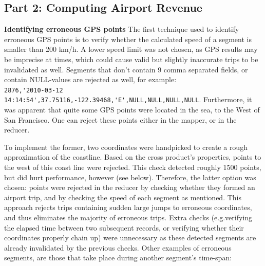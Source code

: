 \documentclass[11pt]{article}
\begin{document}
\subsection*{Part 2: Computing Airport Revenue}

\textbf{Identifying erroneous GPS points}
The first technique used to identify erroneous GPS points is to verify whether the calculated speed of a segment is smaller than 200 km/h. A lower speed limit was not chosen, as GPS results may be imprecise at times, which could cause valid but slightly inaccurate trips to be invalidated as well. Segments that don't contain 9 comma separated fields, or contain NULL-values are rejected as well, for example: \\
\hspace{-2cm}\verb|2876,'2010-03-12 14:14:54',37.75116,-122.39468,'E',NULL,NULL,NULL,NULL|.
Furthermore, it was apparent that quite some GPS points were located in the sea, to the West of San Francisco. One can reject these points either in the mapper, or in the reducer. 



To implement the former, two coordinates were handpicked to create a rough approximation of the coastline. Based on the cross product's properties, points to the west of this coast line were rejected. This check detected roughly 1500 points, but did hurt performance, however (see below). Therefore, the latter option was chosen: points were rejected in the reducer by checking whether they formed an airport trip, and by checking the speed of each segment as mentioned. This approach rejects trips containing sudden large jumps to erroneous coordinates, and thus eliminates the majority of erroneous trips.
Extra checks (e.g.verifying the elapsed time between two subsequent records, or verifying whether their coordinates properly chain up) were unnecessary as these detected segments are already invalidated by the previous checks. Other examples of erroneous segments, are those that take place during another segment's time-span:
\end{document}
